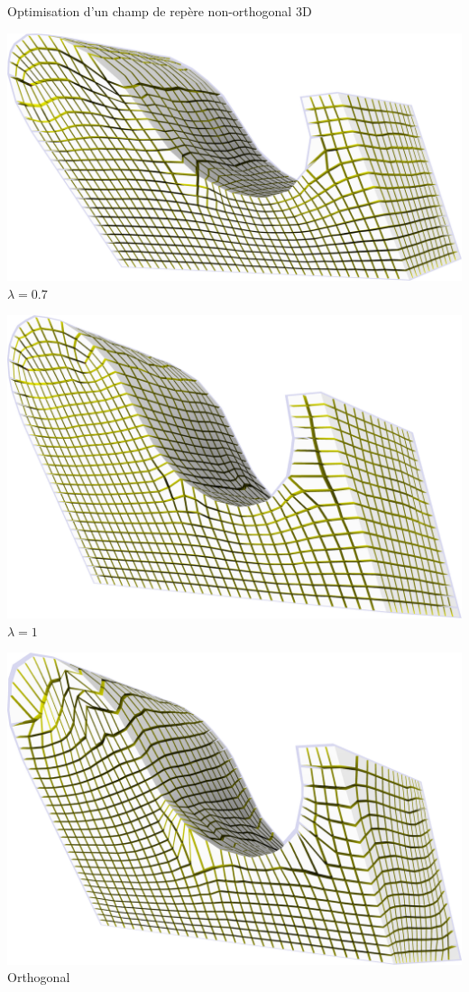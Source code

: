 \begin{frame}{Optimisation d'un champ de repère non-orthogonal 3D}
    \begin{minipage}[b]{0.33\textwidth}
        \centering
        \includegraphics[width=\textwidth]{img_spm_ff/shear_0_7.png}
        $\lambda = 0.7$
    \end{minipage}
    \begin{minipage}[b]{0.28\textwidth}
        \centering
        \includegraphics[width=\textwidth]{img_spm_ff/shear_1.png}
        $\lambda = 1$
    \end{minipage}
    \begin{minipage}[b]{0.26\textwidth}
        \centering
        \includegraphics[width=\textwidth]{img_spm_ff/shear_ortho.png}
        Orthogonal
    \end{minipage}
    
    \normalsize
\end{frame} 

